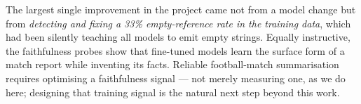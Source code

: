 \documentclass[10pt,a4paper]{article}
\begin{document}
The largest single improvement in the project came not from a model change but from \emph{detecting and fixing a 33\% empty-reference rate in the training data}, which had been silently teaching all models to emit empty strings. Equally instructive, the faithfulness probes show that fine-tuned models learn the surface form of a match report while inventing its facts. Reliable football-match summarisation requires optimising a faithfulness signal --- not merely measuring one, as we do here; designing that training signal is the natural next step beyond this work.


{\small}

\end{document}
